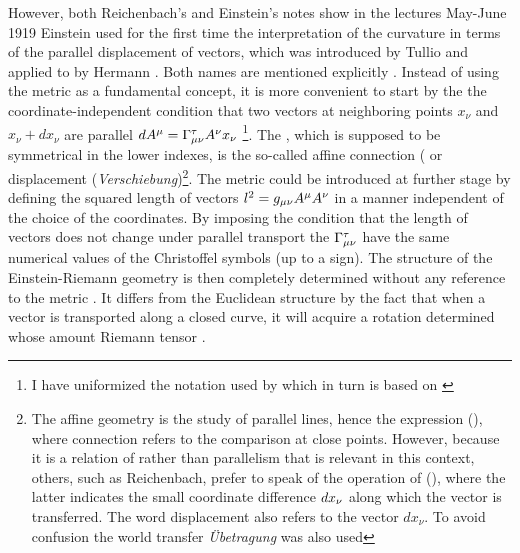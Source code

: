\documentclass[draft]{article}
\newcommand{\xdx}{\ensuremath{x_\nu} and \ensuremath{x_\nu + dx_\nu}\xspace}
\begin{document}
However, both Reichenbach's and Einstein's notes show in the lectures May-June 1919 Einstein used for the first time the interpretation of the curvature in terms of the parallel displacement of vectors, which was introduced by Tullio \citet{Levi-Civita1916} and applied to \rt by Hermann \citet{Weyl1918}. Both names are mentioned explicitly \citep[028-01-03, 33]{HR}. Instead of using the metric as a fundamental concept, it is more convenient to start by the the coordinate-independent condition that two vectors at neighboring points \xdx are parallel $dA^\mu=\Gamma^\tau_{\mu\nu} A^\nu x_\nu$ \citep[028-01-03, 33]{HR}\footnote{I have uniformized the notation used by \citet{Reichenbach1928} which in turn is based on \citet{Eddington1923,Eddington1925}}. The \Gtmn, which is supposed to be symmetrical in the lower indexes, is the so-called affine connection ( or displacement (\textit{Verschiebung})\footnote{The affine geometry is the study of parallel lines, \citet{Weyl1918b} hence the expression  (), where connection refers to the comparison at close points. However, because it is a relation of  rather than parallelism that is relevant in this context, others, such as Reichenbach, prefer to speak of the operation of  (), where the latter indicates the small coordinate difference $dx_{\nu}$ along which the vector is transferred. The word displacement also refers to the vector $dx_\nu$. To avoid confusion the world transfer \textit{Übetragung} was also used}. The metric could be introduced at further stage by defining the squared length of vectors $l^2=g_{\mu\nu} A^\mu A^\nu$ in a manner independent of the choice of the coordinates. By imposing the condition that the length of vectors does not change under parallel transport the $\Gamma^\tau_{\mu\nu}$ have the same numerical values of the Christoffel symbols (up to a sign). The structure of the Einstein-Riemann geometry is then completely determined without any reference to the metric \gmn. It differs from the Euclidean structure by the fact that when a vector is transported along a closed curve, it will acquire a rotation determined whose amount Riemann tensor \riteg.


\end{document}
